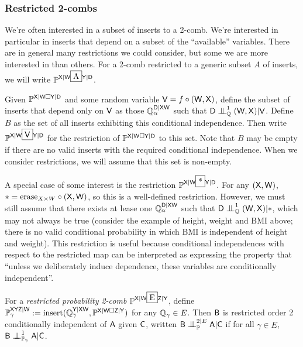 \subsubsection{Restricted 2-combs}

We're often interested in a subset of inserts to a 2-comb. We're interested in particular in inserts that depend on a subset of the ``available'' variables. There are in general many restrictions we could consider, but some we are more interested in than others. For a 2-comb restricted to a generic subset $A$ of inserts, we will write $\prob{P}^{\RV{X}|\RV{W}\framebox{A} \RV{Y}|\RV{D}}$. 

Given $\mathbb{P}^{\mathsf{X}|\mathsf{W}\square \mathsf{Y}|\mathsf{D}}$ and some random variable $\mathsf{V}=f\circ(\mathsf{W},\mathsf{X})$, define the subset of inserts that depend only on $\mathsf{V}$ as those $\mathbb{Q}_\alpha^{\mathsf{D}|\mathsf{XW}}$ such that $\RV{D}\CI^1_{\model{Q}}(\RV{W},\RV{X})|\RV{V}$. Define $B$ as the set of all inserts exhibiting this conditional independence. Then write  $\prob{P}^{\RV{X}|\RV{W}\framebox{\RV{V}} \RV{Y}|\RV{D}}$ for the restriction of $\mathbb{P}^{\mathsf{X}|\mathsf{W}\square \mathsf{Y}|\mathsf{D}}$ to this set. Note that $B$ may be empty if there are no valid inserts with the required conditional independence. When we consider restrictions, we will assume that this set is non-empty.

A special case of some interest is the restriction $\prob{P}^{\RV{X}|\RV{W}\framebox{*} \RV{Y}|\RV{D}}$. For any $(\mathsf{X},\mathsf{W})$, $*=\text{erase}_{X\times W} \circ (\mathsf{X},\mathsf{W})$, so this is a well-defined restriction. However, we must still assume that there exists at lease one $\mathbb{Q}_\alpha^{\mathsf{D}|\mathsf{XW}}$ such that $\RV{D}\CI^1_{\model{Q}}(\RV{W},\RV{X})|*$, which may not always be true (consider the example of height, weight and BMI above; there is no valid conditional probability in which BMI is independent of height and weight). This restriction is useful because conditional independences with respect to the restricted map can be interpreted as expressing the property that ``unless we deliberately induce dependence, these variables are conditionally independent''.

\begin{definition}
For a \emph{restricted probability 2-comb} $\prob{P}^{\RV{X}|\RV{W}\framebox{E}\RV{Z}|\RV{Y}}$, define $\mathbb{P}_\gamma^{\mathsf{XYZ}|\mathsf{W}}:=\text{insert}(\mathbb{Q}_\gamma^{\mathsf{Y}|\mathsf{XW}}, \mathbb{P}^{\mathsf{X}|\mathsf{W}\square\mathsf{Z}|\mathsf{Y}})$ for any $\mathbb{Q}_\gamma\in E$. Then $\mathsf{B}$ is restricted order 2 conditionally independent of $\mathsf{A}$ given $\mathsf{C}$, written $\RV{B}\CI^{2|E}_{\prob{P}}\RV{A}|\RV{C}$ if for all $\gamma\in E$, $\RV{B}\CI^1_{\prob{P}_\gamma}\RV{A}|\RV{C}$.
\end{definition}


